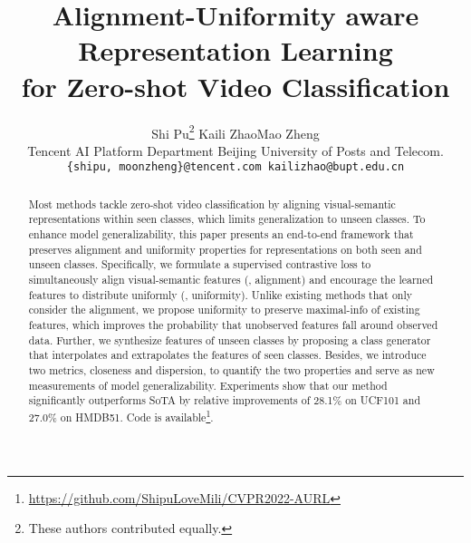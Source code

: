 \documentclass[10pt,twocolumn,letterpaper]{article}
\begin{document}
\title{Alignment-Uniformity aware Representation Learning \\
for Zero-shot Video Classification}

\author{Shi Pu\thanks{These authors contributed equally.}
\quad Kaili Zhao\quad Mao Zheng\\
\hspace{1.2cm}Tencent AI Platform Department \hspace{1.3cm}
Beijing University of Posts and Telecom.
\\
\hspace{-0.5cm}\texttt{\{shipu, moonzheng\}@tencent.com \hspace{0.6cm} kailizhao@bupt.edu.cn}\\
\vspace{-2.5ex}
}


\begin{comment}
\author{First Author\\
Institution1\\
Institution1 address\\
{\tt\small firstauthor@i1.org}
\and
Second Author\\
Institution2\\
First line of institution2 address\\
{\tt\small secondauthor@i2.org}
}
\end{comment}
\maketitle

\begin{abstract}
Most methods tackle zero-shot video classification by aligning visual-semantic representations within seen classes, which limits generalization to unseen classes.
To enhance model generalizability, this paper presents an end-to-end framework that preserves alignment and uniformity properties for representations on both seen and unseen classes.
Specifically, we formulate a supervised contrastive loss to simultaneously align visual-semantic features (\ie, alignment) and encourage the learned features to distribute uniformly (\ie, uniformity).
Unlike existing methods that only consider the alignment, we propose uniformity to preserve maximal-info of existing features, which improves the probability that unobserved features fall around observed data. 
Further, we synthesize features of unseen classes by proposing a class generator that interpolates and extrapolates the features of seen classes. 
Besides, we introduce two metrics, closeness and dispersion, to quantify the two properties and serve as new measurements of model generalizability.
Experiments show that our method significantly outperforms SoTA by relative improvements of 28.1\% on UCF101 and 27.0\% on HMDB51.
Code is available\footnote{\url{https://github.com/ShipuLoveMili/CVPR2022-AURL}}.


\end{abstract}
\end{document}
